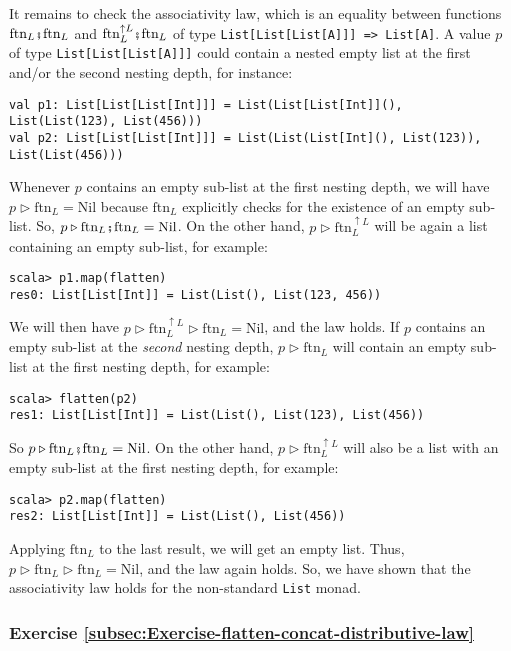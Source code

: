 It remains to check the associativity law, which is an equality between
functions $\text{ftn}_{L}\bef\text{ftn}_{L}$ and $\text{ftn}_{L}^{\uparrow L}\bef\text{ftn}_{L}$
of type \lstinline!List[List[List[A]]] => List[A]!. A value $p$
of type \lstinline!List[List[List[A]]]! could contain a nested empty
list at the first and/or the second nesting depth, for instance:
\begin{lstlisting}
val p1: List[List[List[Int]]] = List(List[List[Int]](), List(List(123), List(456)))
val p2: List[List[List[Int]]] = List(List(List[Int](), List(123)), List(List(456)))
\end{lstlisting}
Whenever $p$ contains an empty sub-list at the first nesting depth,
we will have $p\triangleright\text{ftn}_{L}=\text{Nil}$ because $\text{ftn}_{L}$
explicitly checks for the existence of an empty sub-list. So, $p\triangleright\text{ftn}_{L}\bef\text{ftn}_{L}=\text{Nil}$.
On the other hand, $p\triangleright\text{ftn}_{L}^{\uparrow L}$ will
be again a list containing an empty sub-list, for example:
\begin{lstlisting}
scala> p1.map(flatten)
res0: List[List[Int]] = List(List(), List(123, 456))
\end{lstlisting}
We will then have $p\triangleright\text{ftn}_{L}^{\uparrow L}\triangleright\text{ftn}_{L}=\text{Nil}$,
and the law holds. If $p$ contains an empty sub-list at the \emph{second}
nesting depth, $p\triangleright\text{ftn}_{L}$ will contain an empty
sub-list at the first nesting depth, for example:
\begin{lstlisting}
scala> flatten(p2)
res1: List[List[Int]] = List(List(), List(123), List(456)) 
\end{lstlisting}
So $p\triangleright\text{ftn}_{L}\bef\text{ftn}_{L}=\text{Nil}$.
On the other hand, $p\triangleright\text{ftn}_{L}^{\uparrow L}$ will
also be a list with an empty sub-list at the first nesting depth,
for example:
\begin{lstlisting}
scala> p2.map(flatten)
res2: List[List[Int]] = List(List(), List(456))
\end{lstlisting}
Applying $\text{ftn}_{L}$ to the last result, we will get an empty
list. Thus, $p\triangleright\text{ftn}_{L}\triangleright\text{ftn}_{L}=\text{Nil}$,
and the law again holds. So, we have shown that the associativity
law holds for the non-standard \lstinline!List! monad.

\subsubsection*{Exercise \ref{subsec:Exercise-flatten-concat-distributive-law}}


